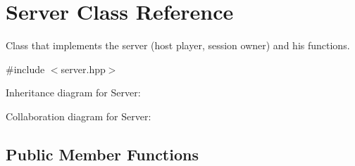 \hypertarget{classServer}{}\section{Server Class Reference}
\label{classServer}


Class that implements the server (host player, session owner) and his functions.  




{\ttfamily \#include $<$server.\+hpp$>$}



Inheritance diagram for Server\+:


Collaboration diagram for Server\+:
\subsection*{Public Member Functions}
